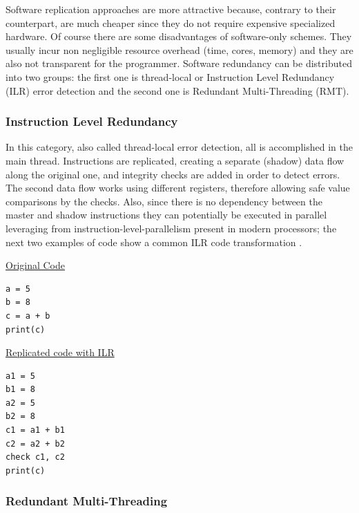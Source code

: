 Software replication approaches are more attractive because, contrary to their counterpart, are much cheaper since they do not require expensive specialized hardware. Of course there are some disadvantages of software-only schemes. They usually incur non negligible resource overhead (time, cores, memory) and they are also not transparent for the programmer. Software redundancy can be distributed into two groups: the first one is thread-local or Instruction Level Redundancy (ILR) error detection and the second one is Redundant Multi-Threading (RMT). 

\subsubsection{Instruction Level Redundancy}
\label{subsec:ILR}

In this category, also called thread-local error detection, all is accomplished in the main thread. Instructions are replicated, creating a separate (shadow) data flow along the original one, and integrity checks are added in order to detect errors. The second data flow works using different registers, therefore allowing safe value comparisons by the checks. Also, since there is no dependency between the master and shadow instructions they can potentially be executed in parallel leveraging from instruction-level-parallelism present in modern processors; the next two examples of code show a common ILR code transformation \cite{kuvaiskii2016haft}. 

\begin{flushleft}
\underline{Original Code}
\end{flushleft}

\begin{lstlisting}[language = pseudocode]
a = 5
b = 8
c = a + b
print(c)
\end{lstlisting}

\begin{flushleft}
\underline{Replicated code with ILR}
\end{flushleft}
\begin{lstlisting}[language = pseudocode]
a1 = 5
b1 = 8
a2 = 5
b2 = 8
c1 = a1 + b1
c2 = a2 + b2
check c1, c2
print(c)
\end{lstlisting}

\subsubsection{Redundant Multi-Threading}
\label{subsec:BacgroundRedundantMultiThreading}

